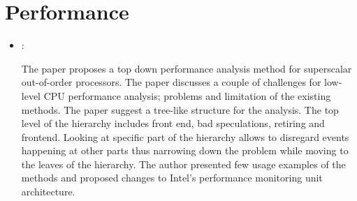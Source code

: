 \section*{Performance}
\begin{itemize}
    \item \cite{Yasin:TopDownCPUPerfAnalysis:2014}:

    The paper proposes a top down performance analysis method for superscalar out-of-order processors. The paper discusses a couple of challenges for low-level CPU performance analysis; problems and limitation of the existing methods. The paper suggest a tree-like structure for the analysis. The top level of the hierarchy includes front end, bad speculations, retiring and frontend. Looking at specific part of the hierarchy allows to disregard events happening at other parts thus narrowing down the problem while moving to the leaves of the hierarchy. The author presented few usage examples of the methods and proposed changes to Intel's performance monitoring unit architecture.
\end{itemize}



